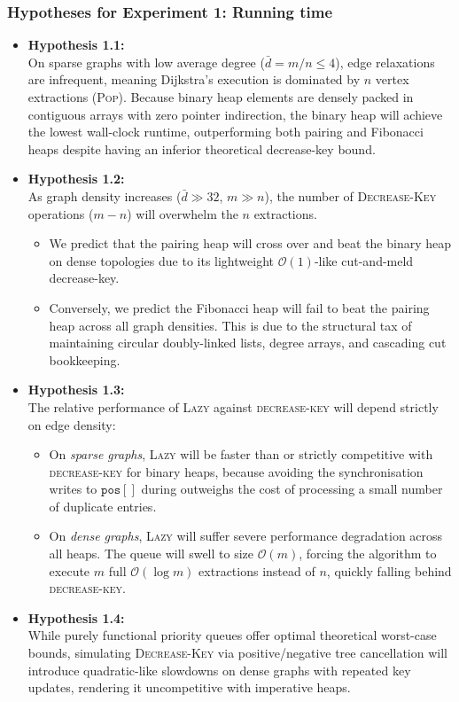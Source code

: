 \subsubsection{Hypotheses for Experiment 1: Running time}
\begin{itemize}
  \item \textbf{Hypothesis 1.1:} \\
  On sparse graphs with low average degree ($\bar{d} = m/n \le 4$), edge relaxations are infrequent, meaning Dijkstra's execution is dominated by $n$ vertex extractions (\textsc{Pop}). Because binary heap elements are densely packed in contiguous arrays with zero pointer indirection, the binary heap will achieve the lowest wall-clock runtime, outperforming both pairing and Fibonacci heaps despite having an inferior theoretical decrease-key bound.
  \item \textbf{Hypothesis 1.2:} \\
  As graph density increases ($\bar{d} \gg 32$, $m \gg n$), the number of \textsc{Decrease-Key} operations ($m - n$) will overwhelm the $n$ extractions. 
  \begin{itemize}
    \item We predict that the pairing heap will cross over and beat the binary heap on dense topologies due to its lightweight $\mathcal{O}(1)$-like cut-and-meld decrease-key.
    \item Conversely, we predict the Fibonacci heap will fail to beat the pairing heap across all graph densities. This is due to the structural tax of maintaining circular doubly-linked lists, degree arrays, and cascading cut bookkeeping.
  \end{itemize}
  \item \textbf{Hypothesis 1.3:} \\
  The relative performance of \textsc{Lazy} against \textsc{decrease-key} will depend strictly on edge density:
  \begin{itemize}
    \item On \emph{sparse graphs}, \textsc{Lazy} will be faster than or strictly competitive with \textsc{decrease-key} for binary heaps, because avoiding the synchronisation writes to $\texttt{pos}[]$ during  outweighs the cost of processing a small number of duplicate entries.
    \item On \emph{dense graphs}, \textsc{Lazy} will suffer severe performance degradation across all heaps. The queue will swell to size $\mathcal{O}(m)$, forcing the algorithm to execute $m$ full $\mathcal{O}(\log m)$ extractions instead of $n$, quickly falling behind \textsc{decrease-key}.
  \end{itemize}
  \item \textbf{Hypothesis 1.4:} \\
  While purely functional priority queues offer optimal theoretical worst-case bounds, simulating \textsc{Decrease-Key} via positive/negative tree cancellation will introduce quadratic-like slowdowns on dense graphs with repeated key updates, rendering it uncompetitive with imperative heaps.
\end{itemize}

